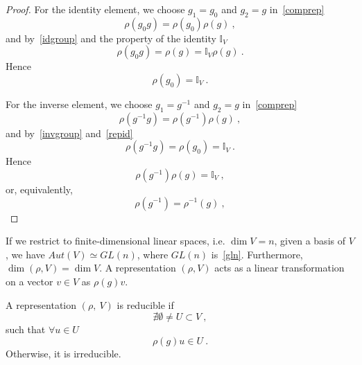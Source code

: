     \begin{proof}
        For the identity element, we choose $g_1 = g_0$ and $g_2 = g$ in~\eqref{comprep}
        \begin{equation*}
            \rho(g_0 g) = \rho(g_0) \rho(g) ~,
        \end{equation*}
        and by~\eqref{idgroup} and the property of the identity $\mathbb I_V$
        \begin{equation*}
            \rho(g_0 g) = \rho(g) = \mathbb I_V \rho(g) ~.
        \end{equation*}
        Hence 
        \begin{equation*}
            \rho(g_0) = \mathbb I_V ~.
        \end{equation*}

        For the inverse element, we choose $g_1 = g^{-1}$ and $g_2 = g$ in~\eqref{comprep}
        \begin{equation*}
            \rho(g^{-1} g) = \rho(g^{-1}) \rho(g) ~,
        \end{equation*}
        and by~\eqref{invgroup} and~\eqref{repid}
        \begin{equation*}
            \rho(g^{-1} g) = \rho(g_0) = \mathbb I_V ~.
        \end{equation*}
        Hence 
        \begin{equation*}
            \rho(g^{-1}) \rho(g) = \mathbb I_V ~,
        \end{equation*}
        or, equivalently,
        \begin{equation*}
            \rho(g^{-1}) = \rho^{-1}(g) ~,
        \end{equation*}
    \end{proof}

    If we restrict to finite-dimensional linear spaces, i.e. $\dim V = n$, given a basis of $V$, we have $Aut(V) \simeq GL(n)$, where $GL(n)$ is~\eqref{gln}. Furthermore, $\dim (\rho,V) = \dim V$. A representation $(\rho,V)$ acts as a linear transformation on a vector $v \in V$ as $\rho(g) v$.

    \begin{definition}
        A representation $(\rho, ~V)$ is reducible if 
        \begin{equation*}
            \nexists \emptyset \neq U \subset V  ~,
        \end{equation*}
        such that $\forall u \in U$
        \begin{equation*}
            \rho(g) u \in U ~.
        \end{equation*}
        Otherwise, it is irreducible.
    \end{definition}

